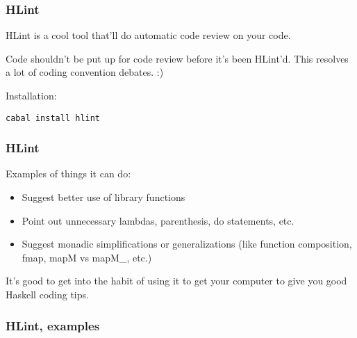 \documentclass{beamer}
\begin{document}
\begin{frame}[fragile]
\frametitle{HLint}

HLint is a cool tool that'll do automatic code review on your code.

\bigskip
Code shouldn't be put up for code review before it's been HLint'd.
This resolves a lot of coding convention debates. :)

\bigskip
Installation:
\begin{verbatim}
cabal install hlint
\end{verbatim}

\end{frame}


\begin{frame}[fragile]
\frametitle{HLint}

Examples of things it can do:

\begin{itemize}
  \item Suggest better use of library functions
  \item Point out unnecessary lambdas, parenthesis, do statements, etc.
  \item Suggest monadic simplifications or generalizations (like
    function composition, fmap, mapM vs mapM\_, etc.)
\end{itemize}
\bigskip

It's good to get into the habit of using it to get your computer to
give you good Haskell coding tips.

\end{frame}


\begin{frame}[fragile]
\frametitle{HLint, examples}



\end{frame}
\end{document}
